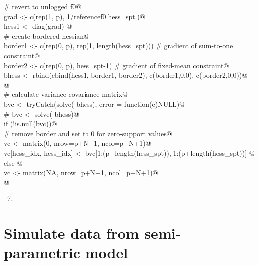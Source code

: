 \documentclass[reqno]{amsart}
\renewcommand{\NWlink}[2]{\hyperlink{#1}{#2}}
\begin{document}
\begin{flushleft}
\begin{list}{}{}
\mbox{}\verb@  # revert to unlogged f0@\\
\mbox{}\verb@  grad <- c(rep(1, p), 1/referencef0[hess_spt])@\\
\mbox{}\verb@  hess1 <- diag(grad) %*% hess[hess_idx, hess_idx] %*% diag(grad)@\\
\mbox{}\verb@  @\\
\mbox{}\verb@  # create bordered hessian@\\
\mbox{}\verb@  border1 <- c(rep(0, p), rep(1, length(hess_spt)))  # gradient of sum-to-one constraint@\\
\mbox{}\verb@  border2 <- c(rep(0, p), hess_spt-1)          # gradient of fixed-mean constraint@\\
\mbox{}\verb@  bhess <- rbind(cbind(hess1, border1, border2), c(border1,0,0), c(border2,0,0))@\\
\mbox{}\verb@  @\\
\mbox{}\verb@  # calculate variance-covariance matrix@\\
\mbox{}\verb@  bvc <- tryCatch(solve(-bhess), error = function(e)NULL)@\\
\mbox{}\verb@  # bvc <- solve(-bhess)@\\
\mbox{}\verb@  if (!is.null(bvc)){@\\
\mbox{}\verb@    # remove border and set to 0 for zero-support values@\\
\mbox{}\verb@    vc <- matrix(0, nrow=p+N+1, ncol=p+N+1)@\\
\mbox{}\verb@    vc[hess_idx, hess_idx] <- bvc[1:(p+length(hess_spt)), 1:(p+length(hess_spt))]     @\\
\mbox{}\verb@  } else {@\\
\mbox{}\verb@    vc <- matrix(NA, nrow=p+N+1, ncol=p+N+1)@\\
\mbox{}\verb@  }@\\
\mbox{}\verb@@{\NWsep}
\end{list}
\vspace{-1.5ex}
\footnotesize
\begin{list}{}{\setlength{\itemsep}{-\parsep}\setlength{\itemindent}{-\leftmargin}}
\item \NWtxtMacroRefIn\ \NWlink{nuweb7}{7}.

\item{}
\end{list}
\vspace{4ex}
\end{flushleft}
\section{Simulate data from semi-parametric model}
\end{document}
